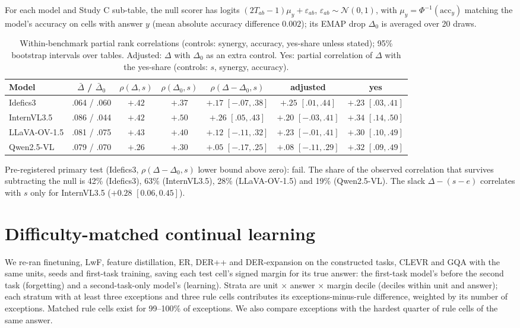 For each model and Study C sub-table, the null scorer has logits $(2T_{ab}-1)\mu_y+\varepsilon_{ab}$,
$\varepsilon_{ab}\sim\mathcal N(0,1)$, with $\mu_y=\Phi^{-1}(\mathrm{acc}_y)$ matching the model's accuracy on cells with
answer $y$ (mean absolute accuracy difference $0.002$); its EMAP drop $\Delta_0$ is averaged over 20 draws.

\begin{table}[h]
\centering\small\setlength{\tabcolsep}{2.5pt}
\caption{Within-benchmark partial rank correlations (controls: synergy, accuracy, yes-share unless stated); 95\%
bootstrap intervals over tables. Adjusted: $\Delta$ with $\Delta_0$ as an extra control. Yes: partial correlation of
$\Delta$ with the yes-share (controls: $s$, synergy, accuracy).}
\label{tab:sup_null}
\begin{tabular}{lcccccc}
\toprule
Model & $\bar\Delta$ / $\bar\Delta_0$ & $\rho(\Delta,s)$ & $\rho(\Delta_0,s)$ & $\rho(\Delta-\Delta_0,s)$ & adjusted & yes \\
\midrule
Idefics3     & .064 / .060 & $+.42$ & $+.37$ & $+.17$ $[-.07,.38]$ & $+.25$ $[.01,.44]$  & $+.23$ $[.03,.41]$ \\
InternVL3.5  & .086 / .044 & $+.42$ & $+.50$ & $+.26$ $[.05,.43]$  & $+.20$ $[-.03,.41]$ & $+.34$ $[.14,.50]$ \\
LLaVA-OV-1.5 & .081 / .075 & $+.43$ & $+.40$ & $+.12$ $[-.11,.32]$ & $+.23$ $[-.01,.41]$ & $+.30$ $[.10,.49]$ \\
Qwen2.5-VL   & .079 / .070 & $+.26$ & $+.30$ & $+.05$ $[-.17,.25]$ & $+.08$ $[-.11,.29]$ & $+.32$ $[.09,.49]$ \\
\bottomrule
\end{tabular}
\end{table}

\noindent
Pre-registered primary test (Idefics3, $\rho(\Delta-\Delta_0,s)$ lower bound above zero): fail. The share of the
observed correlation that survives subtracting the null is 42\% (Idefics3), 63\% (InternVL3.5), 28\% (LLaVA-OV-1.5) and
19\% (Qwen2.5-VL). The slack $\Delta-(s-e)$ correlates with $s$ only for InternVL3.5 ($+0.28$ $[0.06,0.45]$).

\section{Difficulty-matched continual learning}
\label{sup:difficulty}

We re-ran finetuning, LwF, feature distillation, ER, DER++ and DER-expansion on the constructed tasks, CLEVR and GQA
with the same units, seeds and first-task training, saving each test cell's signed margin for its true answer: the
first-task model's before the second task (forgetting) and a second-task-only model's (learning). Strata are unit
$\times$ answer $\times$ margin decile (deciles within unit and answer); each stratum with at least three exceptions and
three rule cells contributes its exceptions-minus-rule difference, weighted by its number of exceptions. Matched rule
cells exist for 99--100\% of exceptions. We also compare exceptions with the hardest quarter of rule cells of the same
answer.

